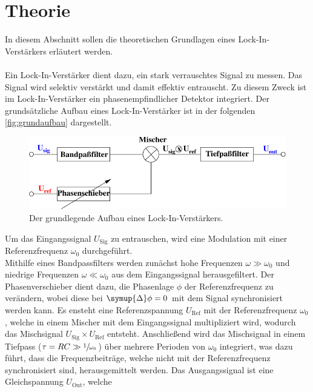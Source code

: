 \section{Theorie}
\label{sec:theorie}

    In diesem Abschnitt sollen die theoretischen Grundlagen eines Lock-In-Verstärkers erläutert
    werden.\\
    \\
    Ein Lock-In-Verstärker dient dazu,
    ein stark verrauschtes Signal zu messen.
    Das Signal wird selektiv verstärkt und damit effektiv entrauscht.
    Zu diesem Zweck ist im Lock-In-Verstärker ein phasenempfindlicher Detektor integriert.
    Der grundsätzliche Aufbau eines Lock-In-Verstärker ist in der folgenden \autoref{fig:grundaufbau} dargestellt.
    \begin{figure}[H]
        \centering
        \includegraphics{content/img/Abb_1.pdf}
        \caption{Der grundlegende Aufbau eines Lock-In-Verstärkers. \cite{versuchsanleitung}}
        \label{fig:grundaufbau}
    \end{figure}
    Um das Eingangssignal $U_\text{Sig}$ zu entrauschen,
    wird eine Modulation mit einer Referenzfrequenz $\omega_0$ durchgeführt.\\
    Mithilfe eines Bandpassfilters werden zunächst hohe Frequenzen $\omega \gg \omega_0$ und niedrige Frequenzen $\omega \ll \omega_0$ aus dem Eingangssignal herausgefiltert.
    Der Phasenverschieber dient dazu,
    die Phasenlage $\phi$ der Referenzfrequenz zu verändern,
    wobei diese bei $\symup{\Delta}\phi = 0$ mit dem Signal synchronisiert werden kann.
    Es ensteht eine Referenzspannung $U_\text{Ref}$ mit der Referenzfrequenz $\omega_0$,
    welche in einem Mischer mit dem Eingangssignal multipliziert wird,
    wodurch das Mischsignal $U_\text{Sig} \times U_\text{Ref}$ entsteht.
    Anschließend wird das Mischsignal in einem Tiefpass ($\tau = RC \gg \sfrac{1}{\omega_0}$) über mehrere Perioden von $\omega_0$ integriert,
    was dazu führt, dass die Frequenzbeiträge,
    welche nicht mit der Referenzfrequenz synchronisiert sind,
    herausgemittelt werden.
    Das Ausgangssignal ist eine Gleichspannung $U_\text{Out}$, welche
